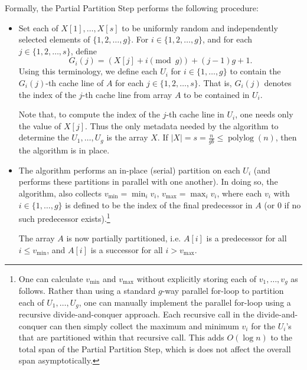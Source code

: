 \documentclass[11pt]{article}
\theoremstyle{remark}
\theoremstyle{remark}
\begin{document}
Formally, the Partial Partition Step performs the following procedure:
\begin{itemize}
\item Set each of $X[1], \ldots, X[s]$ to be uniformly random and
  independently selected elements of $\{1, 2, \ldots, g\}$. For
  $i \in \{1, 2, \ldots, g\}$, and for each $j \in \{1, 2,
  \ldots, s\}$, define
  $$G_i(j) = (X[j] + i \pmod g) + (j - 1)g + 1.$$ Using this
  terminology, we define each $U_i$ for $i \in \{1, \ldots, g\}$ to
  contain the $G_i(j)$-th cache line of $A$ for each $j \in \{1, 2,
  \ldots, s\}$. That is, $G_i(j)$ denotes the index of the $j$-th
  cache line from array $A$ to be contained in $U_i$.

  Note that, to compute the index of the $j$-th cache line in $U_i$,
  one needs only the value of $X[j]$. Thus the only metadata needed by
  the algorithm to determine the $U_1, \ldots, U_g$ is the array
  $X$. If $|X| = s = \frac{n}{gb} \le \operatorname{polylog}(n)$, then
  the algorithm is in place.
  
\item The algorithm performs an in-place (serial) partition on each
  $U_i$ (and performs these partitions in parallel with one
  another). In doing so, the algorithm, also collects
  $v_{\text{min}}=\min_i{v_i}$, $v_{\text{max}}=\max_i{v_i}$, where
	each $v_i$ with $i \in \{1, \ldots, g\}$ is defined to be the index
  of the final predecessor in $A$ (or $0$ if no such predecessor
  exists).\footnote{One can calculate $v_{\text{min}}$ and
    $v_{\text{max}}$ without explicitly storing each of $v_1, \ldots,
		v_{g}$ as follows. Rather than using a standard $g$-way parallel
		for-loop to partition each of $U_1, \ldots, U_{g}$, one can
    manually implement the parallel for-loop using a recursive
    divide-and-conquer approach. Each recursive call in the
    divide-and-conquer can then simply collect the maximum and minimum
    $v_i$ for the $U_i$'s that are partitioned within that recursive
    call. This adds $O(\log n)$ to the total span of the Partial
    Partition Step, which is does not affect the overall span
    asymptotically. %
  }
  
  The array $A$ is now partially partitioned, i.e. $A[i]$ is a
  predecessor for all $i \le v_{\text{min}}$, and $A[i]$ is a successor
  for all $i > v_{\text{max}}$.
\end{itemize}
\end{document}
